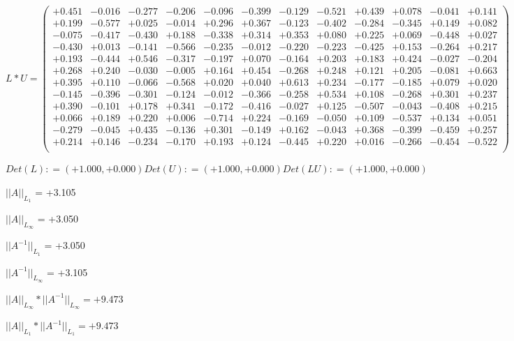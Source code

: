 \documentclass[9pt]{article}
\theoremstyle{plain}
\theoremstyle{definition}
\theoremstyle{remark}
\numberwithin{equation}{section}
\begin{document}
$L * U  = \left(
\begin{array}{
cccccccccccc}
+0.451 & -0.016 & -0.277 & -0.206 & -0.096 & -0.399 & -0.129 & -0.521 & +0.439 & +0.078 & -0.041 & +0.141 \\
+0.199 & -0.577 & +0.025 & -0.014 & +0.296 & +0.367 & -0.123 & -0.402 & -0.284 & -0.345 & +0.149 & +0.082 \\
-0.075 & -0.417 & -0.430 & +0.188 & -0.338 & +0.314 & +0.353 & +0.080 & +0.225 & +0.069 & -0.448 & +0.027 \\
-0.430 & +0.013 & -0.141 & -0.566 & -0.235 & -0.012 & -0.220 & -0.223 & -0.425 & +0.153 & -0.264 & +0.217 \\
+0.193 & -0.444 & +0.546 & -0.317 & -0.197 & +0.070 & -0.164 & +0.203 & +0.183 & +0.424 & -0.027 & -0.204 \\
+0.268 & +0.240 & -0.030 & -0.005 & +0.164 & +0.454 & -0.268 & +0.248 & +0.121 & +0.205 & -0.081 & +0.663 \\
+0.395 & +0.110 & -0.066 & -0.568 & +0.020 & +0.040 & +0.613 & +0.234 & -0.177 & -0.185 & +0.079 & +0.020 \\
-0.145 & -0.396 & -0.301 & -0.124 & -0.012 & -0.366 & -0.258 & +0.534 & +0.108 & -0.268 & +0.301 & +0.237 \\
+0.390 & -0.101 & +0.178 & +0.341 & -0.172 & -0.416 & -0.027 & +0.125 & -0.507 & -0.043 & -0.408 & +0.215 \\
+0.066 & +0.189 & +0.220 & +0.006 & -0.714 & +0.224 & -0.169 & -0.050 & +0.109 & -0.537 & +0.134 & +0.051 \\
-0.279 & -0.045 & +0.435 & -0.136 & +0.301 & -0.149 & +0.162 & -0.043 & +0.368 & -0.399 & -0.459 & +0.257 \\
+0.214 & +0.146 & -0.234 & -0.170 & +0.193 & +0.124 & -0.445 & +0.220 & +0.016 & -0.266 & -0.454 & -0.522 \\
\end{array}
\right)$ \newline 

$Det(L) :    = (+1.000,+0.000)     Det(U) :    = (+1.000,+0.000)     Det(LU) :    = (+1.000,+0.000)$

$||A||_{L_1}$  = +3.105

$||A||_{L_{\infty}}$ = +3.050

$||A^{-1}||_{L_1}$  = +3.050

$||A^{-1}||_{L_{\infty}}$ = +3.105

$||A||_{L_{\infty}} * ||A^{-1}||_{L_{\infty}} = +9.473$

$||A||_{L_1} * ||A^{-1}||_{L_1} = +9.473$
\end{document}
